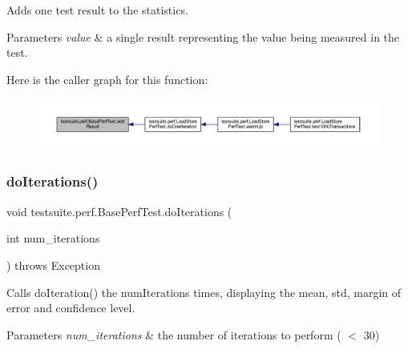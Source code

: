Adds one test result to the statistics.


\begin{DoxyParams}{Parameters}
{\em value} & a single result representing the value being measured in the test. \\
\hline
\end{DoxyParams}
Here is the caller graph for this function\+:
\nopagebreak
\begin{figure}[H]
\begin{center}
\leavevmode
\includegraphics[width=350pt]{classtestsuite_1_1perf_1_1_base_perf_test_a4949a27d2e0b9c314d12f45128004da2_icgraph}
\end{center}
\end{figure}
\mbox{\label{classtestsuite_1_1perf_1_1_base_perf_test_a5d1d0a1bf44d9feb9603a2c98705c6c6}} 
\subsubsection{\texorpdfstring{do\+Iterations()}{doIterations()}}
{\footnotesize\ttfamily void testsuite.\+perf.\+Base\+Perf\+Test.\+do\+Iterations (\begin{DoxyParamCaption}\item[{int}]{num\+\_\+iterations }\end{DoxyParamCaption}) throws Exception\hspace{0.3cm}{\ttfamily [protected]}}

Calls do\+Iteration() the {\ttfamily num\+Iterations} times, displaying the mean, std, margin of error and confidence level.


\begin{DoxyParams}{Parameters}
{\em num\+\_\+iterations} & the number of iterations to perform ( $<$ 30) \\
\hline
\end{DoxyParams}

